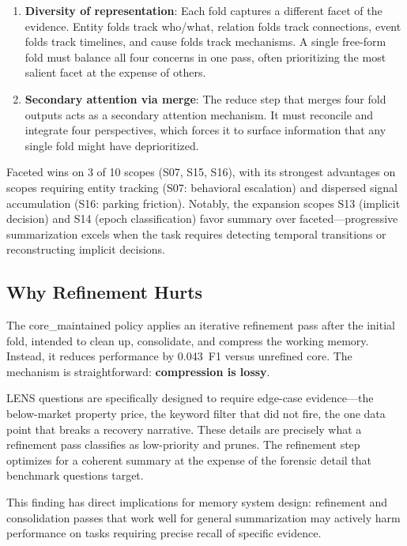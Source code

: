 \documentclass[11pt,a4paper]{article}
\begin{document}
\begin{enumerate}
    \item \textbf{Diversity of representation}: Each fold captures a different facet of the evidence. Entity folds track who/what, relation folds track connections, event folds track timelines, and cause folds track mechanisms. A single free-form fold must balance all four concerns in one pass, often prioritizing the most salient facet at the expense of others.

    \item \textbf{Secondary attention via merge}: The reduce step that merges four fold outputs acts as a secondary attention mechanism. It must reconcile and integrate four perspectives, which forces it to surface information that any single fold might have deprioritized.
\end{enumerate}

Faceted wins on 3 of 10 scopes (S07, S15, S16), with its strongest advantages on scopes requiring entity tracking (S07: behavioral escalation) and dispersed signal accumulation (S16: parking friction). Notably, the expansion scopes S13 (implicit decision) and S14 (epoch classification) favor summary over faceted---progressive summarization excels when the task requires detecting temporal transitions or reconstructing implicit decisions.

\subsection{Why Refinement Hurts}

The core\_maintained policy applies an iterative refinement pass after the initial fold, intended to clean up, consolidate, and compress the working memory. Instead, it reduces performance by 0.043~F1 versus unrefined core. The mechanism is straightforward: \textbf{compression is lossy}.

LENS questions are specifically designed to require edge-case evidence---the below-market property price, the keyword filter that did not fire, the one data point that breaks a recovery narrative. These details are precisely what a refinement pass classifies as low-priority and prunes. The refinement step optimizes for a coherent summary at the expense of the forensic detail that benchmark questions target.

This finding has direct implications for memory system design: refinement and consolidation passes that work well for general summarization may actively harm performance on tasks requiring precise recall of specific evidence.
\end{document}
